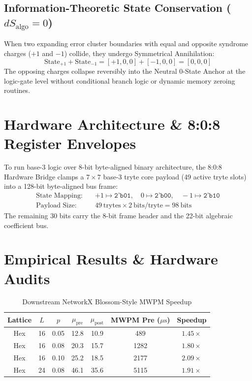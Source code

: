 \documentclass[10pt,journal,compsoc]{IEEEtran}
\begin{document}
\subsection{Information-Theoretic State Conservation ($dS_{\text{algo}} = 0$)}
When two expanding error cluster boundaries with equal and opposite syndrome charges ($+1$ and $-1$) collide, they undergo Symmetrical Annihilation:
\begin{equation}
\text{State}_{+1} + \text{State}_{-1} = [ +1, 0, 0 ] + [ -1, 0, 0 ] = [ 0, 0, 0 ]
\end{equation}
The opposing charges collapse reversibly into the Neutral 0-State Anchor at the logic-gate level without conditional branch logic or dynamic memory zeroing routines.

\section{Hardware Architecture \& 8:0:8 Register Envelopes}
To run base-3 logic over 8-bit byte-aligned binary architecture, the 8:0:8 Hardware Bridge clamps a $7 \times 7$ base-3 tryte core payload (49 active tryte slots) into a 128-bit byte-aligned bus frame:
\begin{align}
\text{State Mapping:} \quad &+1 \mapsto \texttt{2'b01}, \quad 0 \mapsto \texttt{2'b00}, \quad -1 \mapsto \texttt{2'b10} \nonumber \\
\text{Payload Size:} \quad &49~\text{trytes} \times 2~\text{bits/tryte} = 98~\text{bits}
\end{align}
The remaining 30 bits carry the 8-bit frame header and the 22-bit algebraic coefficient bus.

\section{Empirical Results \& Hardware Audits}

\begin{table}[h]
\centering
\caption{Downstream NetworkX Blossom-Style MWPM Speedup}
\label{tab:mwpm_results}
\begin{tabular}{ccccccc}
\toprule
Lattice & $L$ & $p$ & $\mu_{\text{pre}}$ & $\mu_{\text{post}}$ & MWPM Pre ($\mu\text{s}$) & Speedup \\
\midrule
Hex & 16 & 0.05 & 12.8 & 10.9 & 489 & $\mathbf{1.45\times}$ \\
Hex & 16 & 0.08 & 20.3 & 15.7 & 1282 & $\mathbf{1.80\times}$ \\
Hex & 16 & 0.10 & 25.2 & 18.5 & 2177 & $\mathbf{2.09\times}$ \\
Hex & 24 & 0.08 & 46.1 & 35.6 & 5115 & $\mathbf{1.91\times}$ \\
\bottomrule
\end{tabular}
\end{table}
\end{document}
